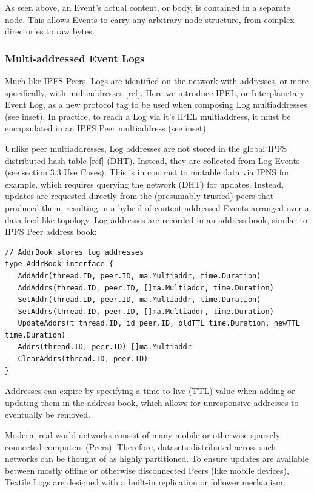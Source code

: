 \documentclass{comjnl}
\begin{document}
As seen above, an Event’s actual content, or body, is contained in a separate node. This allows Events to carry any arbitrary node structure, from complex directories to raw bytes.

\subsubsection{Multi-addressed Event Logs}

Much like IPFS Peers, Logs are identified on the network with addresses, or more specifically, with multiaddresses [ref]. Here we introduce IPEL, or Interplanetary Event Log, as a new protocol tag to be used when composing Log multiaddresses (see inset). In practice, to reach a Log via it’s IPEL multiaddress, it must be encapsulated in an IPFS Peer multiaddress (see inset).

Unlike peer multiaddresses, Log addresses are not stored in the global IPFS distributed hash table [ref] (DHT). Instead, they are collected from Log Events (see section 3.3 Use Cases). This is in contrast to mutable data via IPNS for example, which requires querying the network (DHT) for updates. Instead, updates are requested directly from the (presumably trusted) peers that produced them, resulting in a hybrid of content-addressed Events arranged over a data-feed like topology. Log addresses are recorded in an address book, similar to IPFS Peer address book:

\begin{lstlisting}
// AddrBook stores log addresses
type AddrBook interface {
   AddAddr(thread.ID, peer.ID, ma.Multiaddr, time.Duration)
   AddAddrs(thread.ID, peer.ID, []ma.Multiaddr, time.Duration)
   SetAddr(thread.ID, peer.ID, ma.Multiaddr, time.Duration)
   SetAddrs(thread.ID, peer.ID, []ma.Multiaddr, time.Duration)
   UpdateAddrs(t thread.ID, id peer.ID, oldTTL time.Duration, newTTL time.Duration)
   Addrs(thread.ID, peer.ID) []ma.Multiaddr
   ClearAddrs(thread.ID, peer.ID)
}
\end{lstlisting}

Addresses can expire by specifying a time-to-live (TTL) value when adding or updating them in the address book, which allows for unresponsive addresses to eventually be removed.

Modern, real-world networks consist of many mobile or otherwise sparsely connected computers (Peers). Therefore, datasets distributed across such networks can be thought of as highly partitioned. To ensure updates are available between mostly offline or otherwise disconnected Peers (like mobile devices), Textile Logs are designed with a built-in replication or follower mechanism.
\end{document}
